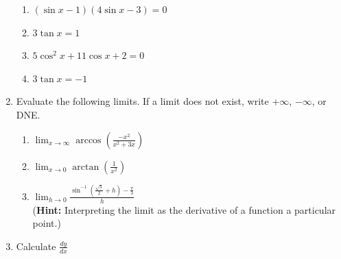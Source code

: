\documentclass[12pt]{article}
\newif\ifans
\begin{document}
\begin{enumerate}
\begin{enumerate}
\item $(\sin{x}-1)(4\sin{x}-3) = 0$

\ifans\fbox{$\frac{\pi}{2}$, $\arcsin\left(\frac{3}{4}\right)$, $\pi-\arcsin\left(\frac{3}{4}\right)$} \fi

\item $3\tan{x}=1$

\ifans \fbox{$\tan^{-1}\left(\frac{1}{3}\right)$, $\pi+\tan^{-1}\left(\frac{1}{3}\right)$} \fi

\item $5\cos^2{x}+11\cos{x}+2=0$

\ifans \fbox{$\arccos\left(-\frac{1}{5}\right)$, $\pi+\arccos\left(-\frac{1}{5}\right)$} \fi

\item $3\tan{x}=-1$

\ifans \fbox{$\pi+\tan^{-1}\left(-\frac{1}{3}\right)$, $2\pi+\tan^{-1}\left(-\frac{1}{3}\right)$} \fi

\end{enumerate}

\item Evaluate the following limits.  If a limit does not exist, write $+\infty$, $-\infty$, or DNE.

\begin{enumerate}

\item $\displaystyle \lim_{x\rightarrow \infty}{\arccos{\left(\frac{-x^2}{x^2+3x}\right)}}$ 

\ifans{\fbox{$\displaystyle \pi$}} \fi

\item $\displaystyle \lim_{x\rightarrow 0}{\arctan{\left(\frac{1}{x^2}\right)}}$ 

\ifans{\fbox{$\displaystyle \frac{\pi}{2}$}} \fi

\item $\lim_{h \rightarrow 0}{\frac{\sin^{-1}{\left(\frac{\sqrt{3}}{2}+h\right)}-\frac{\pi}{3}}{h}}$ \\({\bf Hint:} Interpreting the limit as the derivative of a function a particular point.)

\ifans{\fbox{$\lim_{h \rightarrow 0}{\frac{\sin^{-1}{\left(\frac{\sqrt{3}}{2}+h\right)}-\frac{\pi}{3}}{h}}=\left.\frac{d}{dx}(\sin^{-1}{(x)}\right|_{x=\frac{\sqrt{3}}{2}}=\left.\frac{1}{\sqrt{1-x^2}}\right|_{x=\frac{\sqrt{3}}{2}}=2$}} \fi

\end{enumerate}

\item Calculate $\frac{dy}{dx}$


\end{enumerate}
\end{document}
